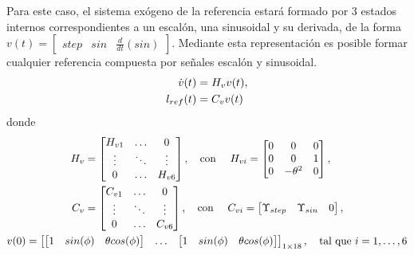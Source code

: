 Para este caso, el sistema exógeno de la referencia estará formado por 3 estados internos correspondientes a un escalón, una sinusoidal y su derivada, de la forma $v(t)=\begin{bmatrix} step & sin & \frac{d}{dt}(sin) \end{bmatrix}$. Mediante esta representación es posible formar cualquier referencia compuesta por señales escalón y sinusoidal.
\begin{align}
\label{eq:sys_ref_fija}
    \dot{v}(t) & = H_v v(t), \notag \\
    l_{ref}(t) & = C_v v(t)
\end{align}
donde 
\begin{gather}
    \begin{align}
    H_v & = \begin{bmatrix}
        H_{v1} & \hdots & 0 \\
        \vdots & \ddots & \vdots \\ 
        0 & \hdots & H_{v6}
    \end{bmatrix}, 
    \quad \textrm{con } \quad
    H_{vi} = \begin{bmatrix}
        0 & 0 & 0 \\
        0 & 0 & 1 \\
        0 & -\theta^2 & 0
    \end{bmatrix}, \notag \\
    C_v & = \begin{bmatrix}
        C_{v1} & \hdots & 0 \\
        \vdots & \ddots & \vdots \\ 
        0 & \hdots & C_{v6}
    \end{bmatrix},
    \quad \textrm{con } \quad
    C_{vi} = \begin{bmatrix}
        \Upsilon_{step} & \Upsilon_{sin} & 0
    \end{bmatrix},
    \end{align} \\
    v(0) = \begin{bmatrix}
        \begin{bmatrix} 1 & sin(\phi) & \theta cos(\phi) \end{bmatrix} & \hdots & \begin{bmatrix} 1 & sin(\phi) & \theta cos(\phi) \end{bmatrix} 
    \end{bmatrix}_{1\times18}, \quad 
    \textrm{tal que } i = 1,\hdots,6 \notag
\end{gather}

